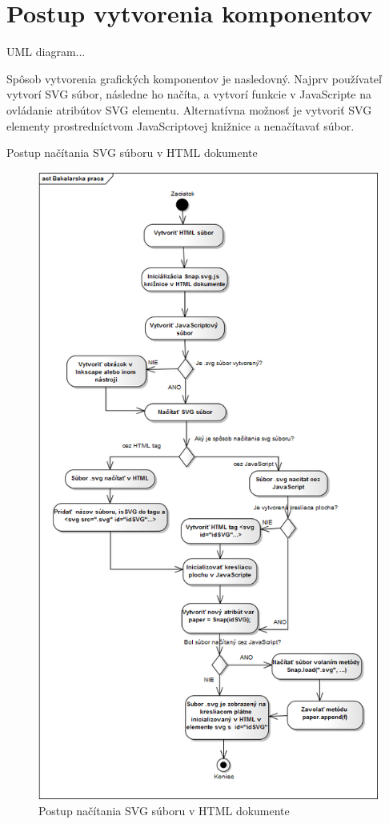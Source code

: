 \chapter{Postup vytvorenia komponentov}

UML diagram... 

Spôsob vytvorenia grafických komponentov je nasledovný. Najprv používateľ vytvorí SVG súbor, následne ho načíta, a vytvorí funkcie v JavaScripte na ovládanie atribútov SVG elementu. 
Alternatívna možnosť je vytvoriť SVG elementy prostredníctvom JavaScriptovej knižnice a nenačítavať súbor. 


Postup načítania SVG súboru v HTML dokumente


\begin{figure}
\centering
\includegraphics[width=0.70\linewidth]{uml/aktivityInicializacie}
\caption{Postup načítania SVG súboru v HTML dokumente}
\label{fig:aktivity1}
\end{figure}

